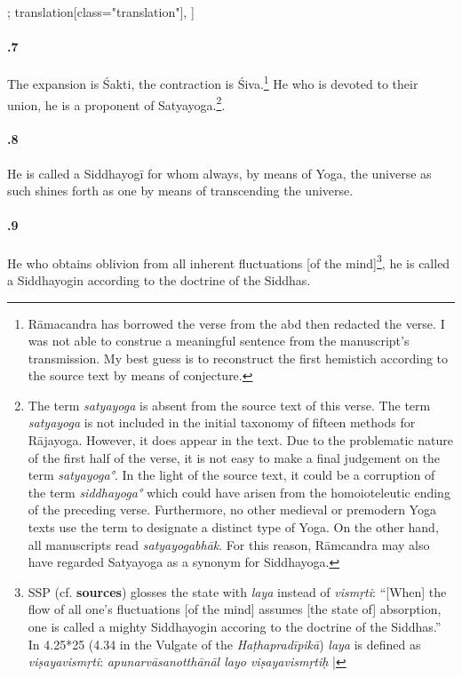 \begin{alignment}[
  texts=edition[class="edition"];
  translation[class="translation"],
  ]
\begin{translation}
\begin{tlate}[44_7]
      \paragraph{.7} \textbf{\Large{\sic*{}}}The expansion is Śakti, the contraction is Śiva.\footnote{Rāmacandra has borrowed the verse from the  abd then redacted the verse. I was not able to construe a meaningful sentence from the manuscript's transmission. My best guess is to reconstruct the first hemistich according to the source text by means of conjecture.}\textbf{\Large{\sic*{}}}
      He who is devoted to their union, he is a proponent of Satyayoga.\footnote{The term \textit{satyayoga} is absent from the source text of this verse. The term \textit{satyayoga} is not included in the initial taxonomy of fifteen methods for Rājayoga. However, it does appear in the text. Due to the problematic nature of the first half of the verse, it is not easy to make a final judgement on the term \textit{satyayoga°}. In the light of the source text, it could be a corruption of the term \textit{siddhayoga°} which could have arisen from the homoioteleutic ending of the preceding verse. Furthermore, no other medieval or premodern Yoga texts use the term to designate a distinct type of Yoga. On the other hand, all manuscripts read \textit{satyayogabhāk}. For this reason, Rāmcandra may also have regarded Satyayoga as a synonym for Siddhayoga.\label{satyayoganote}}.
    \end{tlate}
    \begin{tlate}[44_8]
      \paragraph{.8} He is called a Siddhayogī for whom always, by means of Yoga, the universe as such shines forth as one by means of transcending the universe.
    \end{tlate}
    \begin{tlate}[44_9]
      \paragraph{.9} He who obtains oblivion from all inherent fluctuations [of the mind]\footnote{SSP (cf. \textbf{sources}) glosses the state with \textit{laya} instead of \textit{vismṛti}: ``[When] the flow of all one's fluctuations [of the mind] assumes [the state of] absorption, one is called a mighty Siddhayogin accoring to the doctrine of the Siddhas.'' In  4.25*25 (4.34 in the Vulgate of the \textit{Haṭhapradīpikā}) \textit{laya} is defined as \textit{viṣayavismṛti}: \textit{apunarvāsanotthānāl layo viṣayavismṛtiḥ} |}, he is called a Siddhayogin according to the doctrine of the Siddhas.
    \end{tlate}
    \begin{tlate}[44_10]

\end{tlate}
\end{translation}
\end{alignment}
